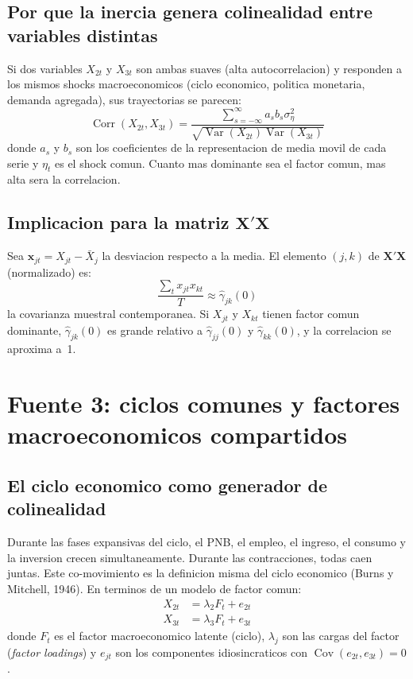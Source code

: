 \documentclass[12pt, letterpaper]{article}
\theoremstyle{remark}
\newcommand{\Var}{\operatorname{Var}}
\newcommand{\Cov}{\operatorname{Cov}}
\newcommand{\Corr}{\operatorname{Corr}}
\begin{document}
\subsection{Por que la inercia genera colinealidad entre variables distintas}

Si dos variables $X_{2t}$ y $X_{3t}$ son ambas suaves (alta autocorrelacion)
y responden a los mismos shocks macroeconomicos (ciclo economico, politica
monetaria, demanda agregada), sus trayectorias se parecen:
\begin{equation}
  \Corr(X_{2t}, X_{3t})
    = \frac{\sum_{s=-\infty}^{\infty} a_s b_s \sigma_\eta^2}
           {\sqrt{\Var(X_{2t})\Var(X_{3t})}}
  \label{eq:corr_factor}
\end{equation}
donde $a_s$ y $b_s$ son los coeficientes de la representacion de media movil
de cada serie y $\eta_t$ es el shock comun. Cuanto mas dominante sea el factor
comun, mas alta sera la correlacion.

\subsection{Implicacion para la matriz $\mathbf{X'X}$}

Sea $\mathbf{x}_{jt} = X_{jt} - \bar X_j$ la desviacion respecto a la media.
El elemento $(j, k)$ de $\mathbf{X'X}$ (normalizado) es:
\begin{equation}
  \frac{\sum_t x_{jt} x_{kt}}{T} \approx \hat\gamma_{jk}(0)
  \label{eq:XpX_elem}
\end{equation}
la covarianza muestral contemporanea. Si $X_{jt}$ y $X_{kt}$ tienen
factor comun dominante, $\hat\gamma_{jk}(0)$ es grande relativo a
$\hat\gamma_{jj}(0)$ y $\hat\gamma_{kk}(0)$, y la correlacion se aproxima a~1.

\section{Fuente 3: ciclos comunes y factores macroeconomicos compartidos}

\subsection{El ciclo economico como generador de colinealidad}

Durante las fases expansivas del ciclo, el PNB, el empleo, el ingreso,
el consumo y la inversion crecen simultaneamente. Durante las contracciones,
todas caen juntas. Este co-movimiento es la definicion misma del ciclo
economico (Burns y Mitchell, 1946). En terminos de un modelo de factor comun:
\begin{align}
  X_{2t} &= \lambda_2 F_t + e_{2t}
  \label{eq:factor2}\\
  X_{3t} &= \lambda_3 F_t + e_{3t}
  \label{eq:factor3}
\end{align}
donde $F_t$ es el factor macroeconomico latente (ciclo), $\lambda_j$ son las
cargas del factor (\textit{factor loadings}) y $e_{jt}$ son los componentes
idiosincraticos con $\Cov(e_{2t}, e_{3t}) = 0$.
\end{document}
